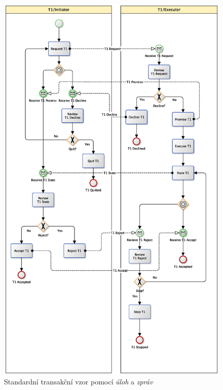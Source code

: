 \begin{figure}[htbp]
\centering
\includegraphics[width=\textwidth,height=\textheight,keepaspectratio]{obrazky/transaction-standard-messages-1}
\caption{Standardní transakční vzor pomocí \textit{úloh} a \textit{zpráv}}
\label{fig:St_trans_ulohy_zpravy}
\end{figure}

